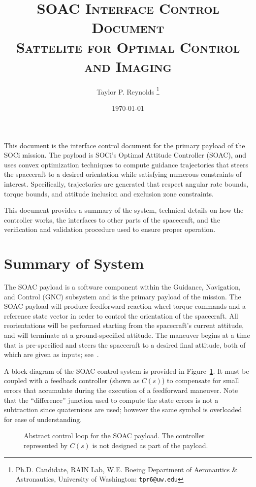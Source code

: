 \documentclass[12pt]{article}
\title{\textsc{SOAC Interface Control Document \\ {\small \textbf{S}attelite for \textbf{O}ptimal \textbf{C}ontrol and \textbf{I}maging}}}
\author{
  Taylor P. Reynolds%
  \thanks{Ph.D. Candidate, RAIN Lab, W.E. Boeing Department of Aeronautics \& Astronautics, University of Washington: \texttt{tpr6@uw.edu} } }
\date{\today}
\begin{document}
 
\maketitle

This document is the interface control document for the primary payload of the SOCi mission. The payload is SOCi's Optimal Attitude Controller (SOAC), and uses convex optimization techniques to compute guidance trajectories that steers the spacecraft to a desired orientation while satisfying numerous constraints of interest. Specifically, trajectories are generated that respect angular rate bounds, torque bounds, and attitude inclusion and exclusion zone constraints. 

This document provides a summary of the system, technical details on how the controller works, the interfaces to other parts of the spacecraft, and the verification and validation procedure used to ensure proper operation. 

\section{Summary of System}\label{sec:summary}

The SOAC payload is a software component within the Guidance, Navigation, and Control (GNC) subsystem and is the primary payload of the mission. The SOAC payload will produce feedforward reaction wheel torque commands and a reference state vector in order to control the orientation of the spacecraft. All reorientations will be performed starting from the spacecraft’s current attitude, and will terminate at a ground-specified attitude. The maneuver begins at a time that is pre-specified and steers the spacecraft to a desired final attitude, both of which are given as inputs; see~.

A block diagram of the SOAC control system is provided in Figure~\ref{fig:soac_loop}. It must be coupled with a feedback controller (shown as $C(s)$) to compensate for small errors that accumulate during the execution of a feedforward maneuver. Note that the ``difference'' junction used to compute the state errors is not a subtraction since quaternions are used; however the same symbol is overloaded for ease of understanding.

\begin{figure}[tbh!]
\centering

\caption{Abstract control loop for the SOAC payload. The controller represented by $C(s)$ is not designed as part of the payload.}
\label{fig:soac_loop}
\end{figure}
\end{document}
